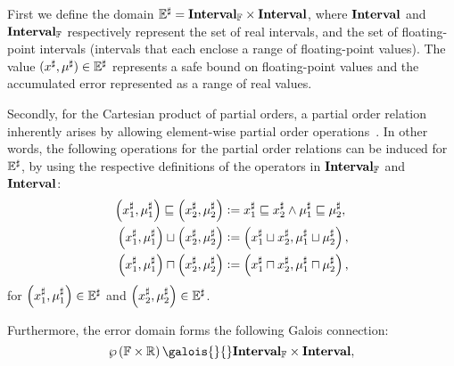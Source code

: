 First we define the domain $\mathbb{E}^\sharp = \mathbf{Interval}_\mathbb{F}\times\mathbf{Interval}$,
where $\mathbf{Interval}$ and $\mathbf{Interval}_\mathbb{F}$ respectively represent the
set of real intervals, and the set of floating-point intervals (intervals
that each enclose a range of floating-point values).  The value $(x^\sharp,
\mu^\sharp) \in \mathbb{E}^\sharp$ represents a safe bound on floating-point
values and the accumulated error represented as a range of real values.

Secondly, for the Cartesian product of partial orders, a partial order
relation inherently arises by allowing element-wise partial order
operations~\cite{abramsky94}.  In other words, the following operations for the
partial order relations can be induced for $\mathbb{E}^\sharp$, by using the respective
definitions of the operators in $\mathbf{Interval}_\mathbb{F}$ and $\mathbf{Interval}$:
\begin{equation}
    \begin{aligned}
        \left( x^\sharp_1, \mu^\sharp_1 \right) \sqsubseteq
        \left( x^\sharp_2, \mu^\sharp_2 \right)
        &\vcentcolon=
            x^\sharp_1 \sqsubseteq x^\sharp_2 \wedge
            \mu^\sharp_1 \sqsubseteq \mu^\sharp_2, \\
        \left( x^\sharp_1, \mu^\sharp_1 \right) \sqcup
        \left( x^\sharp_2, \mu^\sharp_2 \right)
        &\vcentcolon=
            \left( x^\sharp_1 \sqcup x^\sharp_2,
              \mu^\sharp_1 \sqcup \mu^\sharp_2 \right), \\
        \left( x^\sharp_1, \mu^\sharp_1 \right) \sqcap
        \left( x^\sharp_2, \mu^\sharp_2 \right)
        &\vcentcolon=
            \left( x^\sharp_1 \sqcap x^\sharp_2,
              \mu^\sharp_1 \sqcap \mu^\sharp_2 \right),
    \end{aligned}
\end{equation}
for $\left( x^\sharp_1, \mu^\sharp_1 \right) \in \mathbb{E}^\sharp$ and
$\left( x^\sharp_2, \mu^\sharp_2 \right) \in \mathbb{E}^\sharp$.

Furthermore, the error domain forms the following Galois connection:
\begin{equation}
    \powersetof{\floatset\times\realset}
    \galois{}{}
    \floatintervalset\times\intervalset,
\end{equation}

